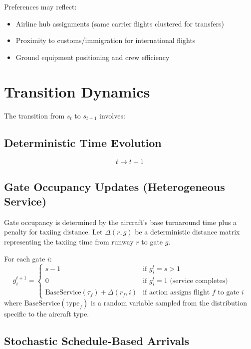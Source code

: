 Preferences may reflect:
\begin{itemize}
	\item Airline hub assignments (same carrier flights clustered for transfers)
	\item Proximity to customs/immigration for international flights
	\item Ground equipment positioning and crew efficiency
\end{itemize}

\section{Transition Dynamics}

The transition from $s_t$ to $s_{t+1}$ involves:

\subsection{Deterministic Time Evolution}

\begin{equation}
	t \to t+1
\end{equation}

\subsection{Gate Occupancy Updates (Heterogeneous Service)}

Gate occupancy is determined by the aircraft's base turnaround time plus a penalty for taxiing distance.
Let $\Delta(r, g)$ be a deterministic distance matrix representing the taxiing time from runway $r$ to gate $g$.

For each gate $i$:
%
\begin{equation}
	g_i^{t+1} = \begin{cases}
		s-1 & \text{if } g_i^t = s > 1 \\
		0 & \text{if } g_i^t = 1 \text{ (service completes)} \\
		\text{BaseService}(\tau_f) + \Delta(r_f, i) & \text{if action assigns 
			flight } f \text{ to gate } i
	\end{cases}
\end{equation}
%
where $\text{BaseService}(\text{type}_f)$ is a random variable sampled from the distribution specific to the aircraft type.

\subsection{Stochastic Schedule-Based Arrivals}

